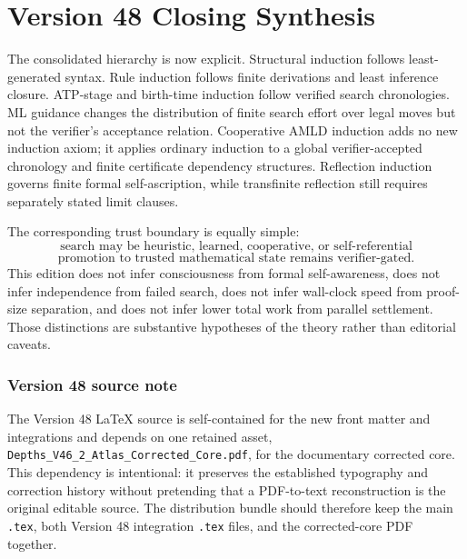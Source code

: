 \documentclass[11pt]{article}
\theoremstyle{remark}
\begin{document}
\clearpage
\part*{Version 48 Closing Synthesis}
The consolidated hierarchy is now explicit. Structural induction follows least-generated syntax. Rule induction follows finite derivations and least inference closure. ATP-stage and birth-time induction follow verified search chronologies. ML guidance changes the distribution of finite search effort over legal moves but not the verifier's acceptance relation. Cooperative AMLD induction adds no new induction axiom; it applies ordinary induction to a global verifier-accepted chronology and finite certificate dependency structures. Reflection induction governs finite formal self-ascription, while transfinite reflection still requires separately stated limit clauses.

The corresponding trust boundary is equally simple:
\[
\boxed{\text{search may be heuristic, learned, cooperative, or self-referential}}
\]
\[
\boxed{\text{promotion to trusted mathematical state remains verifier-gated}.}
\]
This edition does not infer consciousness from formal self-awareness, does not infer independence from failed search, does not infer wall-clock speed from proof-size separation, and does not infer lower total work from parallel settlement. Those distinctions are substantive hypotheses of the theory rather than editorial caveats.

\section*{Version 48 source note}
The Version 48 LaTeX source is self-contained for the new front matter and integrations and depends on one retained asset, \texttt{Depths\_V46\_2\_Atlas\_Corrected\_Core.pdf}, for the documentary corrected core. This dependency is intentional: it preserves the established typography and correction history without pretending that a PDF-to-text reconstruction is the original editable source. The distribution bundle should therefore keep the main \texttt{.tex}, both Version 48 integration \texttt{.tex} files, and the corrected-core PDF together.
\end{document}
